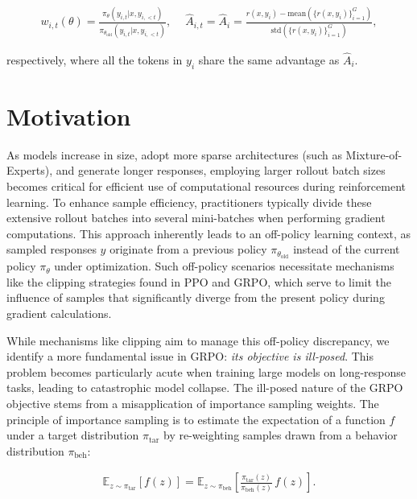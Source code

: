 \begin{align}
    w_{i,t}(\theta)=\frac{ \pi_{\theta} (y_{i,t} | x, y_{i,<t}) }{ \pi_{\theta_\text{old}} (y_{i,t} | x,y_{i,<t})},\quad\ 
    \widehat{A}_{i,t} = \widehat{A}_{i} = \frac{r(x, y_i) - \mathrm{mean} \left( \{ r(x, y_i) \}_{i=1}^G \right) }{ \mathrm{std} \left( \{ r(x, y_i) \}_{i=1}^G \right) },
\end{align}

respectively, where all the tokens in $y_i$ share the same advantage as $\widehat{A}_{i}$.

\section{Motivation}
\label{sec:motivation}

As models increase in size, adopt more sparse architectures (such as Mixture-of-Experts), and generate longer responses, employing larger rollout batch sizes becomes critical for efficient use of computational resources during reinforcement learning. To enhance sample efficiency, practitioners typically divide these extensive rollout batches into several mini-batches when performing gradient computations. This approach inherently leads to an off-policy learning context, as sampled responses $y$ originate from a previous policy $\pi_{\theta_\text{old}}$ instead of the current policy $\pi_\theta$ under optimization. Such off-policy scenarios necessitate mechanisms like the clipping strategies found in PPO and GRPO, which serve to limit the influence of samples that significantly diverge from the present policy during gradient calculations.

While mechanisms like clipping aim to manage this off-policy discrepancy, we identify a more fundamental issue in GRPO: \textit{its objective is ill-posed}. This problem becomes particularly acute when training large models on long-response tasks, leading to catastrophic model collapse. The ill-posed nature of the GRPO objective stems from a misapplication of importance sampling weights. The principle of importance sampling is to estimate the expectation of a function $f$ under a target distribution $\pi_\text{tar}$ by re-weighting samples drawn from a behavior distribution $\pi_\text{beh}$:

\begin{align}
\mathbb{E}_{z \sim \pi_\text{tar}} \left[ f(z) \right] = \mathbb{E}_{z \sim \pi_\text{beh}} \left[ \frac{ \pi_\text{tar} (z) }{ \pi_\text{beh} (z)} \, f(z) \right].
\end{align}

